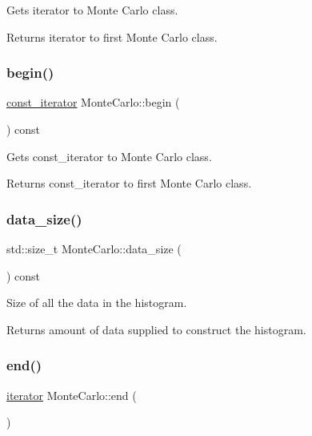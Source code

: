 Gets iterator to Monte Carlo class. \begin{DoxyReturn}{Returns}
iterator to first Monte Carlo class. 
\end{DoxyReturn}
\mbox{\label{classMonteCarlo_a9d5ce89a44acd99626bed6351091e981}} 
\subsubsection{\texorpdfstring{begin()}{begin()}\hspace{0.1cm}{\footnotesize\ttfamily [2/2]}}
{\footnotesize\ttfamily \hyperlink{classMonteCarlo_a74dc0884e3b02002956de4fb84a0bb01}{const\+\_\+iterator} Monte\+Carlo\+::begin (\begin{DoxyParamCaption}{ }\end{DoxyParamCaption}) const\hspace{0.3cm}{\ttfamily [inline]}}

Gets const\+\_\+iterator to Monte Carlo class. \begin{DoxyReturn}{Returns}
const\+\_\+iterator to first Monte Carlo class. 
\end{DoxyReturn}
\mbox{\label{classMonteCarlo_a994af145a2a63a51c96a13d6e472b793}} 
\subsubsection{\texorpdfstring{data\+\_\+size()}{data\_size()}}
{\footnotesize\ttfamily std\+::size\+\_\+t Monte\+Carlo\+::data\+\_\+size (\begin{DoxyParamCaption}{ }\end{DoxyParamCaption}) const\hspace{0.3cm}{\ttfamily [inline]}}

Size of all the data in the histogram. \begin{DoxyReturn}{Returns}
amount of data supplied to construct the histogram. 
\end{DoxyReturn}
\mbox{\label{classMonteCarlo_a52b4ed803009aa163306b63796827d61}} 
\subsubsection{\texorpdfstring{end()}{end()}\hspace{0.1cm}{\footnotesize\ttfamily [1/2]}}
{\footnotesize\ttfamily \hyperlink{classMonteCarlo_a8f83ff48a51d2f19e5c87b8fade7bbe3}{iterator} Monte\+Carlo\+::end (\begin{DoxyParamCaption}{ }\end{DoxyParamCaption})\hspace{0.3cm}{\ttfamily [inline]}}

